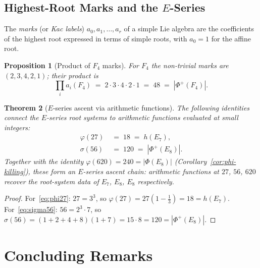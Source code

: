 \documentclass[11pt]{amsart}
\theoremstyle{plain}
\newtheorem{theorem}{Theorem}[section]
\newtheorem{proposition}[theorem]{Proposition}
\theoremstyle{definition}
\theoremstyle{remark}
\renewcommand{\Phi}{\varPhi}
\begin{document}
\subsection{Highest-Root Marks and the $E$-Series}\label{sec:marks}

The \emph{marks} (or \emph{Kac labels}) $a_0,a_1,\ldots,a_r$ of a simple
Lie algebra are the coefficients of the highest root expressed in terms of
simple roots, with $a_0=1$ for the affine root.

\begin{proposition}[Product of $F_4$ marks]\label{prop:f4-marks}
For $F_4$ the non-trivial marks are $(2,3,4,2,1)$; their product is
\[
  \prod_i a_i(F_4) \;=\; 2\cdot3\cdot4\cdot2\cdot1 \;=\; 48 \;=\; |\Phi^+(F_4)|.
\]
\end{proposition}

\begin{theorem}[$E$-series ascent via arithmetic functions]%
\label{thm:e-series-ascent}
The following identities connect the $E$-series root systems to arithmetic
functions evaluated at small integers:
\begin{align}
  \varphi(27) &\;=\; 18 \;=\; h(E_7), \label{eq:phi27} \\
  \sigma(56)  &\;=\; 120 \;=\; |\Phi^+(E_8)|. \label{eq:sigma56}
\end{align}
Together with the identity $\varphi(620)=240=|\Phi(E_8)|$
(Corollary~\ref{cor:phi-killing}), these form an \emph{$E$-series ascent
chain}: arithmetic functions at $27$, $56$, $620$ recover the root-system
data of $E_7$, $E_8$, $E_8$ respectively.
\end{theorem}

\begin{proof}
For~\eqref{eq:phi27}: $27=3^3$, so $\varphi(27)=27(1-\tfrac{1}{3})=18=h(E_7)$.
For~\eqref{eq:sigma56}: $56=2^3\cdot7$, so
$\sigma(56)=(1+2+4+8)(1+7)=15\cdot8=120=|\Phi^+(E_8)|$.
\end{proof}

\section{Concluding Remarks}\label{sec:conclusion}
\end{document}
